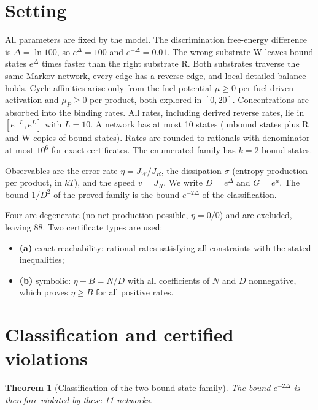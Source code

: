 \documentclass[10pt,twocolumn]{article}
\providecommand{\tightlist}{\setlength{\itemsep}{0pt}\setlength{\parskip}{0pt}}
\newtheorem{theorem}{Theorem}\newtheorem{proposition}{Proposition}\newtheorem{lemma}{Lemma}\newtheorem{corollary}{Corollary}
\theoremstyle{definition}\newtheorem{definition}{Definition}\newtheorem{example}{Example}
\begin{document}
\section{Setting}\label{setting}

All parameters are fixed by the model. The discrimination free-energy difference is \(\Delta = \ln 100\), so \(e^{\Delta} = 100\) and \(e^{-\Delta} = 0.01\). The wrong substrate W leaves bound states \(e^{\Delta}\) times faster than the right substrate R. Both substrates traverse the same Markov network, every edge has a reverse edge, and local detailed balance holds. Cycle affinities arise only from the fuel potential \(\mu \geq 0\) per fuel-driven activation and \(\mu_P \geq 0\) per product, both explored in \([0,20]\). Concentrations are absorbed into the binding rates. All rates, including derived reverse rates, lie in \([e^{-L}, e^{L}]\) with \(L = 10\). A network has at most 10 states (unbound states plus R and W copies of bound states). Rates are rounded to rationals with denominator at most \(10^6\) for exact certificates. The enumerated family has \(k=2\) bound states.

Observables are the error rate \(\eta = J_W/J_R\), the dissipation \(\sigma\) (entropy production per product, in \(kT\)), and the speed \(v = J_R\). We write \(D = e^{\Delta}\) and \(G = e^{\mu}\). The bound \(1/D^2\) of the proved family is the bound \(e^{-2\Delta}\) of the classification.

Four are degenerate (no net production possible, \(\eta = 0/0\)) and are excluded, leaving 88. Two certificate types are used:

\begin{itemize}
\tightlist
\item
  \textbf{(a)} exact reachability: rational rates satisfying all constraints with the stated inequalities;
\item
  \textbf{(b)} symbolic: \(\eta - B = N/D\) with all coefficients of \(N\) and \(D\) nonnegative, which proves \(\eta \geq B\) for all positive rates.
\end{itemize}

\section{Classification and certified violations}\label{classification-and-certified-violations}

\begin{theorem}[Classification of the two-bound-state family]
The bound \(e^{-2\Delta}\) is therefore violated by these 11 networks.
\end{theorem}
\end{document}
